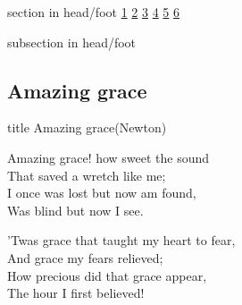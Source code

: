\documentclass{beamer}
\begin{document}
{
{ 
 {
 \begin{beamercolorbox}[ht=4.5ex,dp=1.5ex,%
      leftskip=.3cm,rightskip=.3cm plus1fil]{section in head/foot}
 \fontsize{12}{25}\selectfont 
\hyperlink{Amazing grace[](Newton)1}{1}
\hyperlink{Amazing grace[](Newton)2}{2}
\hyperlink{Amazing grace[](Newton)3}{3}
\hyperlink{Amazing grace[](Newton)4}{4}
\hyperlink{Amazing grace[](Newton)5}{5}
\hyperlink{Amazing grace[](Newton)6}{6}
 
 \end{beamercolorbox}%
  \begin{beamercolorbox}[ht=2.5ex,dp=1.125ex,%
   leftskip=.3cm,rightskip=.3cm plus1fil]{subsection in head/foot}
   \insertauthor
 \end{beamercolorbox}%
 }
}
\subsection{ Amazing grace }

\hypertarget{Amazing grace[](Newton)}{}
\begin{frame}{}
 \vfill
  \centering
  \begin{beamercolorbox}[sep=8pt,center,shadow=true,rounded=true]{title}
    Amazing grace(Newton)    
  \end{beamercolorbox}
  \vfill
\end{frame}

\hypertarget{Amazing grace[](Newton)1}{}
\begin{frame}{}
\fontsize{ 18 }{ 23 }\selectfont

Amazing grace! how sweet the sound\\ 
That saved a wretch like me;\\ 
I once was lost but now am found,\\ 
Was blind but now I see. 

\end{frame}

\hypertarget{Amazing grace[](Newton)2}{}
\begin{frame}{}
\fontsize{ 18 }{ 23 }\selectfont

'Twas grace that taught my heart to fear,\\ 
And grace my fears relieved;\\ 
How precious did that grace appear,\\ 
The hour I first believed! 

\end{frame}

}
\end{document}

